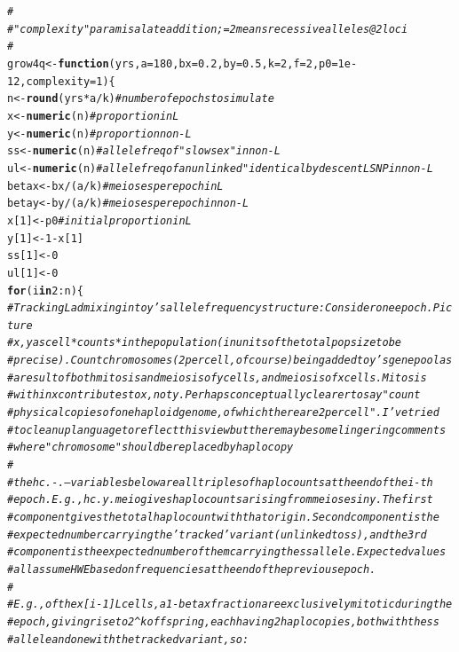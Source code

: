 \documentclass{article}\usepackage[]{graphicx}\usepackage[]{color}
\makeatletter
\newcommand{\hlnum}[1]{\textcolor[rgb]{0.686,0.059,0.569}{#1}}%
\newcommand{\hlcom}[1]{\textcolor[rgb]{0.678,0.584,0.686}{\textit{#1}}}%
\newcommand{\hlopt}[1]{\textcolor[rgb]{0,0,0}{#1}}%
\newcommand{\hlstd}[1]{\textcolor[rgb]{0.345,0.345,0.345}{#1}}%
\newcommand{\hlkwa}[1]{\textcolor[rgb]{0.161,0.373,0.58}{\textbf{#1}}}%
\newcommand{\hlkwb}[1]{\textcolor[rgb]{0.69,0.353,0.396}{#1}}%
\newcommand{\hlkwc}[1]{\textcolor[rgb]{0.333,0.667,0.333}{#1}}%
\newcommand{\hlkwd}[1]{\textcolor[rgb]{0.737,0.353,0.396}{\textbf{#1}}}%
\newenvironment{kframe}{%
 \def\at@end@of@kframe{}%
 \ifinner\ifhmode%
  \def\at@end@of@kframe{\end{minipage}}%
  \begin{minipage}{\columnwidth}%
 \fi\fi%
 \def\FrameCommand##1{\hskip\@totalleftmargin \hskip-\fboxsep
 \colorbox{shadecolor}{##1}\hskip-\fboxsep
     \hskip-\linewidth \hskip-\@totalleftmargin \hskip\columnwidth}%
 \MakeFramed {\advance\hsize-\width
   \@totalleftmargin\z@ \linewidth\hsize
   \@setminipage}}%
 {\par\unskip\endMakeFramed%
 \at@end@of@kframe}
\newenvironment{knitrout}{}{} %
\makeatother
\begin{document}
\begin{knitrout}
\begin{kframe}
\begin{alltt}
\hlcom{#}
\hlcom{# "complexity" param is a late addition; =2 means recessive alleles @ 2 loci}
\hlcom{#}
\hlstd{grow4q} \hlkwb{<-} \hlkwa{function}\hlstd{(}\hlkwc{yrs}\hlstd{,} \hlkwc{a}\hlstd{=}\hlnum{180}\hlstd{,} \hlkwc{bx}\hlstd{=}\hlnum{0.2}\hlstd{,} \hlkwc{by}\hlstd{=}\hlnum{0.5}\hlstd{,} \hlkwc{k}\hlstd{=}\hlnum{2}\hlstd{,} \hlkwc{f}\hlstd{=}\hlnum{2}\hlstd{,} \hlkwc{p0}\hlstd{=}\hlnum{1e-12}\hlstd{,} \hlkwc{complexity}\hlstd{=}\hlnum{1}\hlstd{)\{}
  \hlstd{n}   \hlkwb{<-} \hlkwd{round}\hlstd{(yrs}\hlopt{*}\hlstd{a}\hlopt{/}\hlstd{k)}\hlcom{# number of epochs to simulate}
  \hlstd{x}   \hlkwb{<-} \hlkwd{numeric}\hlstd{(n)}    \hlcom{# proportion in L}
  \hlstd{y}   \hlkwb{<-} \hlkwd{numeric}\hlstd{(n)}    \hlcom{# proportion non-L}
  \hlstd{ss}  \hlkwb{<-} \hlkwd{numeric}\hlstd{(n)}    \hlcom{# allele freq of "slowsex" in non-L}
  \hlstd{ul}  \hlkwb{<-} \hlkwd{numeric}\hlstd{(n)}    \hlcom{# allele freq of an unlinked "identical by descent L SNP in non-L }
  \hlstd{betax} \hlkwb{<-} \hlstd{bx}\hlopt{/}\hlstd{(a}\hlopt{/}\hlstd{k)}    \hlcom{# meioses per epoch in L}
  \hlstd{betay} \hlkwb{<-} \hlstd{by}\hlopt{/}\hlstd{(a}\hlopt{/}\hlstd{k)}    \hlcom{# meioses per epoch in non-L}
  \hlstd{x[}\hlnum{1}\hlstd{]}  \hlkwb{<-} \hlstd{p0}          \hlcom{# initial proportion in L}
  \hlstd{y[}\hlnum{1}\hlstd{]}  \hlkwb{<-} \hlnum{1}\hlopt{-}\hlstd{x[}\hlnum{1}\hlstd{]}
  \hlstd{ss[}\hlnum{1}\hlstd{]} \hlkwb{<-} \hlnum{0}
  \hlstd{ul[}\hlnum{1}\hlstd{]} \hlkwb{<-} \hlnum{0}
  \hlkwa{for}\hlstd{(i} \hlkwa{in} \hlnum{2}\hlopt{:}\hlstd{n)\{}
    \hlcom{# Tracking L admixing into y's allele frequency structure: Consider one epoch. Picture}
    \hlcom{# x,y as cell *counts* in the population (in units of the total pop size to be}
    \hlcom{# precise). Count chromosomes (2 per cell, of course) being added to y's gene pool as}
    \hlcom{# a result of both mitosis and meiosis of y cells, and meiosis of x cells. Mitosis}
    \hlcom{# within x contributes to x, not y.  Perhaps conceptually clearer to say "count}
    \hlcom{# physical copies of one haploid genome, of which there are 2 per cell".  I've tried}
    \hlcom{# to clean up language to reflect this view but there may be some lingering comments}
    \hlcom{# where "chromosome" should be replaced by haplocopy}
    \hlcom{# }
    \hlcom{# the hc.-.-- variables below are all triples of haplocounts at the end of the i-th}
    \hlcom{# epoch.  E.g., hc.y.meio gives haplocounts arising from meioses in y. The first}
    \hlcom{# component gives the total haplocount with that origin.  Second component is the}
    \hlcom{# expected number carrying the 'tracked' variant (unlinked to ss), and the 3rd}
    \hlcom{# component is the expected number of them carrying the ss allele.  Expected values}
    \hlcom{# all assume HWE based on frequencies at the end of the previous epoch.}
    \hlcom{# }
    \hlcom{# E.g., of the x[i-1] L cells, a 1-betax fraction are exclusively mitotic during the}
    \hlcom{# epoch, giving rise to 2^k offspring, each having 2 haplocopies, both with the ss}
    \hlcom{# allele and one with the tracked variant, so:}


\end{alltt}
\end{kframe}
\end{knitrout}
\end{document}
